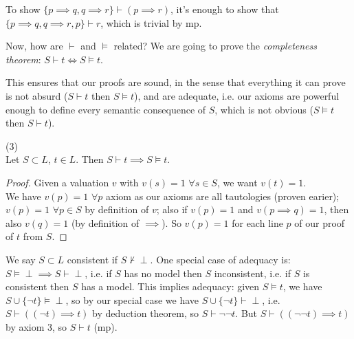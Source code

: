 \documentclass[a4paper]{article}
\begin{document}
\begin{eg}
To show $\{p \implies q, q \implies r\} \vdash (p \implies r)$, it's enough to show that $\{p \implies q, q \implies r, p\} \vdash r$, which is trivial by mp.
\end{eg}

Now, how are $\vdash$ and $\vDash$ related? We are going to prove the \emph{completeness theorem}: $S \vdash t \iff S \vDash t$.

This ensures that our proofs are sound, in the sense that everything it can prove is not absurd ($S \vdash t$ then $S \vDash t$), and are adequate, i.e. our axioms are powerful enough to define every semantic consequence of $S$, which is not obvious ($S \vDash t$ then $S \vdash t$).

\begin{prop} (3)\\
Let $S \subset L$, $t \in L$. Then $S \vdash t \implies S \vDash t$.
\begin{proof}
Given a valuation $v$ with $v(s) =1$ $\forall s \in S$, we want $v(t) = 1$.\\
We have $v(p) = 1$ $\forall p$ axiom as our axioms are all tautologies (proven earier); $v(p)=1$ $\forall p \in S$ by definition of $v$; also if $v(p) = 1$ and $v(p \implies q) = 1$, then also $v(q) = 1$ (by definition of $\implies$). So $v(p) = 1$ for each line $p$ of our proof of $t$ from $S$.
\end{proof}
\end{prop}

We say $S \subset L$ consistent if $S \not\vdash \perp$. One special case of adequacy is: $S \vDash \perp \implies S \vdash \perp$, i.e. if $S$ has no model then $S$ inconsistent, i.e. if $S$ is consistent then $S$ has a model. This implies adequacy: given $S \vDash t$, we have $S \cup \{\neg t\} \vDash \perp$, so by our special case we have $S \cup \{\neg t\} \vdash \perp$, i.e. $S \vdash ((\neg t) \implies t)$ by deduction theorem, so $S \vdash \neg\neg t$. But $S \vdash ((\neg\neg t) \implies t)$ by axiom 3, so $S \vdash t$ (mp).

\iffalse
\begin{equation*}
\begin{aligned}

\end{aligned}
\end{equation*}
\fi
\end{document}
